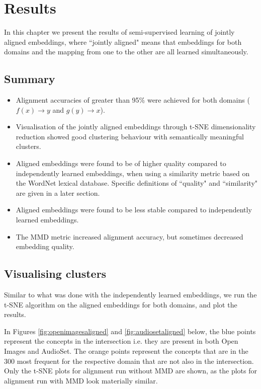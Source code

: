 \chapter{Results}

In this chapter we present the results of semi-supervised learning of jointly aligned embeddings, where ``jointly aligned" means that embeddings for both domains and the mapping from one to the other are all learned simultaneously. 


\section{Summary}
\begin{itemize}
    \item Alignment accuracies of greater than 95\% were achieved for both domains ($f(x) \rightarrow y$ and $g(y) \rightarrow x$).
    \item Visualisation of the jointly aligned embeddings through t-SNE dimensionality reduction showed good clustering behaviour with semantically meaningful clusters.
    \item Aligned embeddings were found to be of higher quality compared to independently learned embeddings, when using a similarity metric based on the WordNet lexical database. Specific definitions of ``quality" and ``similarity" are given in a later section.
    \item Aligned embeddings were found to be less stable compared to independently learned embeddings. 
    \item The MMD metric increased alignment accuracy, but sometimes decreased embedding quality. 
\end{itemize}


\section{Visualising clusters}
Similar to what was done with the independently learned embeddings, we run the t-SNE algorithm on the aligned embeddings for both domains, and plot the results.

In Figures \ref{fig:openimagesaligned} and \ref{fig:audiosetaligned} below, the blue points represent the concepts in the intersection i.e. they are present in both Open Images and AudioSet. The orange points represent the concepts that are in the 300 most frequent for the respective domain that are not also in the intersection. Only the t-SNE plots for alignment run without MMD are shown, as the plots for alignment run with MMD look materially similar. 

